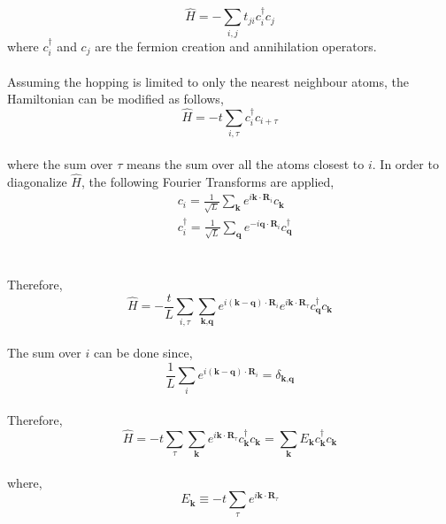 \documentclass{article}
\begin{document}
\begin{equation}
\hat{H} = -\sum_{i,j} t_{ji} c_i^\dagger c_j 
\end{equation}
where $c_{i}^{\dagger}$ and $c_{j}$ are the fermion creation and annihilation operators.
\\\\
Assuming the hopping is limited to only the nearest neighbour atoms, the Hamiltonian can be modified as follows,
\\
\begin{equation}
\hat{H} = -t \sum_{i,\tau}  c_i^\dagger c_{i+\tau} 
\end{equation}
\\
where the sum over $\tau$ means the sum over all the atoms closest to $i$. In order to diagonalize $\hat{H}$, the following Fourier Transforms are applied,
\\
\begin{equation}
\begin{split}
& c_i = \frac{1}{\sqrt{L}} \sum_{\textbf{k}} e^{i \textbf{k} \cdot \textbf{R}_i}  c_\textbf{k} \\
& c_i^\dagger = \frac{1}{\sqrt{L}} \sum_{\textbf{q}} e^{-i \textbf{q} \cdot \textbf{R}_i}  c_\textbf{q}^\dagger
\end{split}
\end{equation}
\\\\
Therefore, 
\\
\begin{equation}
\hat{H} = -\frac{t}{L} \sum_{i,\tau}\sum_{\textbf{k}, \textbf{q}} e^{i (\textbf{k}-\textbf{q}) \cdot \textbf{R}_i} e^{i \textbf{k} \cdot \textbf{R}_\tau} c_\textbf{q}^\dagger c_\textbf{k}
\end{equation}
\\
The sum over $i$ can be done since, 
\begin{equation}
\frac{1}{L} \sum_{i}  e^{i (\textbf{k}-\textbf{q}) \cdot \textbf{R}_i} =  \delta_{\textbf{k}, \textbf{q}}
\end{equation}
\\
Therefore, 
\begin{equation}
\hat{H} = -t \sum_{\tau}\sum_{\textbf{k}} e^{i \textbf{k} \cdot \textbf{R}_\tau} c_\textbf{k}^\dagger c_\textbf{k} =   \sum_{\textbf{k}} E_\textbf{k} c_\textbf{k}^\dagger c_\textbf{k}
\end{equation}
\\
where, 
\\
\begin{equation}
E_\textbf{k} \equiv -t \sum_{\tau} e^{i \textbf{k} \cdot \textbf{R}_\tau} 
\end{equation}
\end{document}
